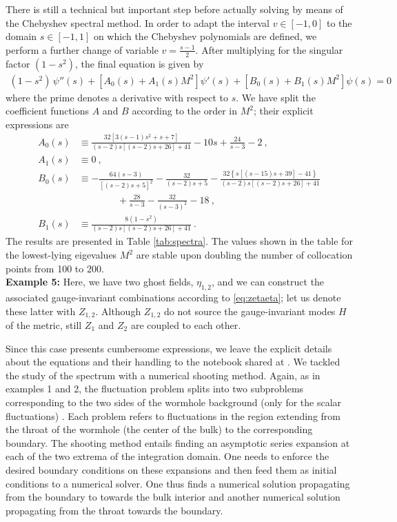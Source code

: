 There is still a technical but important step before actually solving by means of the Chebyshev spectral method. In order to adapt the interval $v\in\left[-1,0\right]$ to the domain $s\in\left[-1,1\right]$ on which the Chebyshev polynomials are defined, we perform a further change of variable $v=\frac{s-1}{2}$. After multiplying for the singular factor $(1-s^2)$, the final equation is given by
\begin{eqnarray}
	(1-s^2)\, \psi''(s)
	+ 
	\left[A_0(s) + A_1(s) M^2\right]\psi'(s)
	+
	\left[B_0(s) + B_1(s) M^2\right] \psi(s)
	=
	0
\end{eqnarray}
where the prime denotes a derivative with respect to $s$. %
We have split the coefficient functions $A$ and $B$ according to the order in $M^2$; their explicit expressions are
\begin{align}
	A_0(s) &\equiv 
	\frac{32 \left[3 (s-1) s^2+s+7\right]}{(s-2) s \left[(s-2) s+26\right]+41}-10 s+\frac{24}{s-3}-2
	\ , \\
	A_1(s) &\equiv 0
	\ , \\ 
	B_0(s) &\equiv 
	-\frac{64 (s-3)}{\left[(s-2) s+5\right]^2}-\frac{32}{(s-2) s+5}-\frac{32 \left\{s \left[(s-15) s+39\right]-41\right\}}{(s-2) s \left[(s-2) s+26\right]+41}
	\\ \nonumber & \qquad \qquad 
	+\frac{28}{s-3}-\frac{32}{(s-3)^2}-18
	\ , \\
	B_1(s) &\equiv 
	\frac{8(1-s^2)}{(s-2) s \left[(s-2) s+26\right]+41}\ .
\end{align}
The results are presented in Table \ref{tab:spectra}. The values shown in the table for the lowest-lying eigevalues $M^2$ are stable upon doubling the number of collocation points from 100 to 200.\\ 

\noindent 
\textbf{Example 5:} Here, we have two ghost fields, $\eta_{1,2}$, and we can construct the associated gauge-invariant combinations according to \eqref{eq:zetaeta}; let us denote these latter with $Z_{1,2}$. %
Although $Z_{1,2}$ do not source the gauge-invariant modes $H$ of the metric, still $Z_1$ and $Z_2$ are coupled to each other. 

Since this case presents cumbersome expressions, we leave the explicit details about the equations and their handling to the notebook shared at \cite{code}. We tackled the study of the spectrum with a numerical shooting method. Again, as in examples 1 and 2, the fluctuation problem splits into two subproblems corresponding to the two sides of the wormhole background (only for the scalar fluctuations) . Each problem refers to fluctuations in the region extending from the throat of the wormhole (the center of the bulk) to the corresponding boundary. The shooting method entails finding an asymptotic series expansion at each of the two extrema of the integration domain. One needs to enforce the desired boundary conditions on these expansions and then feed them as initial conditions to a numerical solver. One thus finds a numerical solution propagating from the boundary to towards the bulk interior and another numerical solution propagating from the throat towards the boundary.


